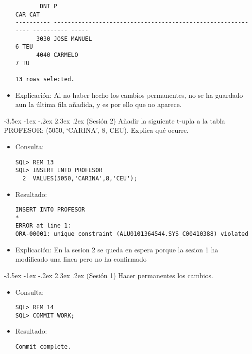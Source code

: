 \documentclass[11pt]{report}
\makeatletter
\renewcommand\chapter{\@startsection{chapter}{0}{\z@}%
    {-3.5ex \@plus -1ex \@minus -.2ex}%
    {2.3ex \@plus.2ex}%
    {\normalfont\Large\bfseries}}
\makeatother
\begin{document}
\begin{itemize}
\begin{verbatim}
       DNI P                                                                   CAR CAT                                                                                                                  
---------- ------------------------------------------------------------ ---------- -----                                                                                                                
      3030 JOSE MANUEL                                                           6 TEU                                                                                                                  
      4040 CARMELO                                                               7 TU                                                                                                                   

13 rows selected.
  \end{verbatim}

  \item{Explicación:} Al no haber hecho los cambios permanentes, no  se ha guardado aun la última  fila añadida, y es por ello que no aparece.
\end{itemize}

\chapter{(Sesión 2) Añadir la siguiente t-upla a la tabla PROFESOR: (5050, ‘CARINA’, 8, CEU). Explica qué ocurre.}
\begin{itemize}
  \item Consulta:
  \begin{verbatim}
SQL> REM 13
SQL> INSERT INTO PROFESOR
  2  VALUES(5050,'CARINA',8,'CEU');
  \end{verbatim}
  \item{Resultado:}
  \begin{verbatim}
INSERT INTO PROFESOR
*
ERROR at line 1:
ORA-00001: unique constraint (ALU0101364544.SYS_C00410388) violated 
  \end{verbatim}
  \item Explicación: En la sesion 2 se queda en espera porque la sesion 1 ha modificado una linea pero no ha confirmado
\end{itemize}

\chapter{(Sesión 1) Hacer permanentes los cambios.}
\begin{itemize}
  \item Consulta:
  \begin{verbatim}
SQL> REM 14
SQL> COMMIT WORK;
  \end{verbatim}
  \item{Resultado:}
  \begin{verbatim}
Commit complete.
  \end{verbatim}
\end{itemize}
\end{document}
